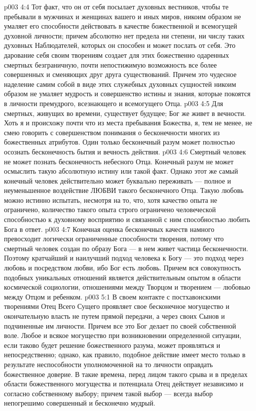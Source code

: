 \vs p003 4:4 Тот факт, что он от себя посылает духовных вестников, чтобы те пребывали в мужчинах и женщинах вашего и иных миров, никоим образом не умаляет его способности действовать в качестве божественной и всемогущей духовной личности; причем абсолютно нет предела ни степени, ни числу таких духовных Наблюдателей, которых он способен и может послать от себя. Это дарование себя своим творениям создает для этих божественно одаренных смертных безграничную, почти непостижимую возможность все более совершенных и сменяющих друг друга существований. Причем это чудесное наделение самим собой в виде этих служебных духовных сущностей никоим образом не умаляет мудрость и совершенство истины и знания, которые покоятся в личности премудрого, всезнающего и всемогущего Отца.
\vs p003 4:5 \pc Для смертных, живущих во времени, существует будущее; Бог же живет в вечности. Хоть я и происхожу почти что из места пребывания Божества, я, тем не менее, не смею говорить с совершенством понимания о бесконечности многих из божественных атрибутов. Один только бесконечный разум может полностью осознать бесконечность бытия и вечность действия.
\vs p003 4:6 \pc Смертный человек не может познать бесконечность небесного Отца. Конечный разум не может осмыслить такую абсолютную истину или такой факт. Однако этот же самый конечный человек действительно может  буквально переживать --- полное и неуменьшенное воздействие ЛЮБВИ такого бесконечного Отца. Такую любовь можно истинно испытать, несмотря на то, что, хотя качество опыта не ограничено, количество такого опыта строго ограничено человеческой способностью к духовному восприятию и связанной с ним способностью любить Бога в ответ.
\vs p003 4:7 Конечная оценка бесконечных качеств намного превосходит логически ограниченные способности творения, потому что смертный человек создан по образу Бога --- в нем живет частица бесконечности. Поэтому кратчайший и наилучший подход человека к Богу --- это подход через любовь и посредством любви, ибо Бог есть любовь. Причем вся совокупность подобных уникальных отношений является действительным опытом в области космической социологии, отношениями между Творцом и творением --- любовью между Отцом и ребенком.
\vs p003 5:1 В своем контакте с постхавонскими творениями Отец Всего Сущего проявляет свое бесконечное могущество и окончательную власть не путем прямой передачи, а через своих Сынов и подчиненные им личности. Причем все это Бог делает по своей собственной воле. Любое и всякое могущество при возникновении определенной ситуации, если таково будет решение божественного разума, может проявляться и непосредственно; однако, как правило, подобное действие имеет место только в результате неспособности уполномоченной на то личности оправдать божественное доверие. В такие времена, перед лицом такого срыва и в пределах области божественного могущества и потенциала Отец действует независимо и согласно собственному выбору; причем такой выбор --- всегда выбор непогрешимо совершенный и бесконечно мудрый.
